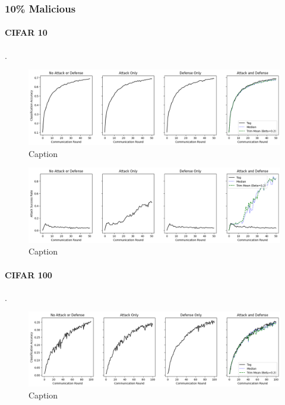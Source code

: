 \documentclass{article} %
\begin{document}
\subsubsection{10\% Malicious}


%
\paragraph{CIFAR 10}.

\begin{figure}[H]
    \centering
    \includegraphics[width=\textwidth]{cifar_10/neuro/tag/centralized/alpha10000--alpha_val10000/visuals/clean_accuracy--n_malicious1--beta0.2.png}
    \caption{Caption}
    \label{fig:my_label}
\end{figure}

\begin{figure}[H]
    \centering
    \includegraphics[width=\textwidth]{cifar_10/neuro/tag/centralized/alpha10000--alpha_val10000/visuals/pois_accuracy--n_malicious1--beta0.2.png}
    \caption{Caption}
    \label{fig:my_label}
\end{figure}


%
\paragraph{CIFAR 100}.

\begin{figure}[H]
    \centering
    \includegraphics[width=\textwidth]{cifar_100/neuro/tag/centralized/alpha10000--alpha_val10000/visuals/clean_accuracy--n_malicious1--beta0.2.png}
    \caption{Caption}
    \label{fig:my_label}
\end{figure}
\end{document}
